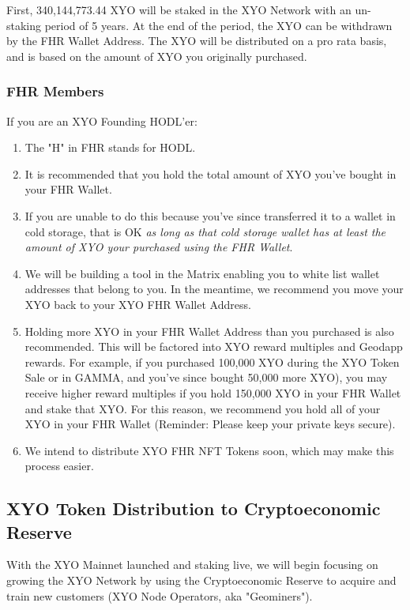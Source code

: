\documentclass{article}
\begin{document}
First, 340,144,773.44 XYO will be staked in the XYO Network with an un-staking period of 5 years. At the end of the period, the XYO can be withdrawn by the FHR Wallet Address. The XYO will be distributed on a pro rata basis, and is based on the amount of XYO you originally purchased.

\subsubsection{FHR Members}

If you are an XYO Founding HODL'er:

\begin{enumerate}
  \item The "H" in FHR stands for HODL.
  \item It is recommended that you hold the total amount of XYO you've bought in your FHR Wallet. 
  \item If you are unable to do this because you've since transferred it to a wallet in cold storage, that is OK \textit{as long as that cold storage wallet has at least the amount of XYO your purchased using the FHR Wallet}.
  \item We will be building a tool in the Matrix enabling you to white list wallet addresses that belong to you. In the meantime, we recommend you move your XYO back to your XYO FHR Wallet Address.
  \item Holding more XYO in your FHR Wallet Address than you purchased is also recommended. This will be factored into XYO reward multiples and Geodapp rewards. For example, if you purchased 100,000 XYO during the XYO Token Sale or in GAMMA, and you've since bought 50,000 more XYO), you may receive higher reward multiples if you hold 150,000 XYO in your FHR Wallet and stake that XYO. For this reason, we recommend you hold all of your XYO in your FHR Wallet (Reminder: Please keep your private keys secure).
  \item We intend to distribute XYO FHR NFT Tokens soon, which may make this process easier.
\end{enumerate}


\subsection{XYO Token Distribution to Cryptoeconomic Reserve}

With the XYO Mainnet launched and staking live, we will begin focusing on growing the XYO Network by using the Cryptoeconomic Reserve to acquire and train new customers (XYO Node Operators, aka "Geominers").
\end{document}
